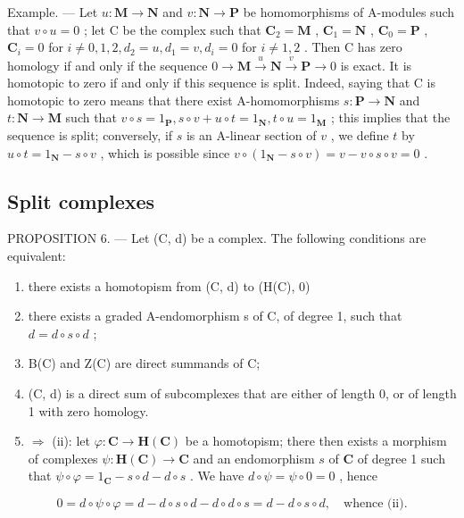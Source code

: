 Example. --- Let \(u: \mathbf{M} \to \mathbf{N}\) and \(v: \mathbf{N} \to \mathbf{P}\) be homomorphisms of A-modules such that \(v \circ u = 0\) ; let C be the complex such that \(\mathbf{C}_2 = \mathbf{M}\) , \(\mathbf{C}_1 = \mathbf{N}\) , \(\mathbf{C}_0 = \mathbf{P}\) , \(\mathbf{C}_i = 0\) for \(i \neq 0, 1, 2, d_2 = u, d_1 = v, d_i = 0\) for \(i \neq 1, 2\) . Then C has zero homology if and only if the sequence \(0 \to \mathbf{M} \xrightarrow{u} \mathbf{N} \xrightarrow{v} \mathbf{P} \to 0\) is exact. It is homotopic to zero if and only if this sequence is split. Indeed, saying that C is homotopic to zero means that there exist A-homomorphisms \(s: \mathbf{P} \to \mathbf{N}\) and \(t: \mathbf{N} \to \mathbf{M}\) such that \(v \circ s = 1_{\mathbf{P}}, s \circ v + u \circ t = 1_{\mathbf{N}}, t \circ u = 1_{\mathbf{M}}\) ; this implies that the sequence is split; conversely, if \(s\) is an A-linear section of \(v\) , we define \(t\) by \(u \circ t = 1_{\mathbf{N}} - s \circ v\) , which is possible since \(v \circ (1_{\mathbf{N}} - s \circ v) = v - v \circ s \circ v = 0\) .

\subsection{Split complexes}

PROPOSITION 6. — Let (C, d) be a complex. The following conditions are equivalent:

\begin{enumerate}
\def\labelenumi{(\roman{enumi})}
\item
  there exists a homotopism from (C, d) to (H(C), 0)
\item
  there exists a graded A-endomorphism s of C, of degree 1, such that \(d = d \circ s \circ d\) ;
\item
  B(C) and Z(C) are direct summands of C;
\item
  (C, d) is a direct sum of subcomplexes that are either of length 0, or of length 1 with zero homology.
\item
  \(\Rightarrow\) (ii): let \(\varphi: \mathbf{C} \to \mathbf{H}(\mathbf{C})\) be a homotopism; there then exists a morphism of complexes \(\psi: \mathbf{H}(\mathbf{C}) \to \mathbf{C}\) and an endomorphism \(s\) of \(\mathbf{C}\) of degree 1 such that \(\psi \circ \varphi = 1_{\mathbf{C}} - s \circ d - d \circ s\) . We have \(d \circ \psi = \psi \circ 0 = 0\) , hence
\end{enumerate}

\[
0 = d \circ \psi \circ \varphi = d - d \circ s \circ d - d \circ d \circ s = d - d \circ s \circ d, \quad \text {whence (ii)}.
\]

